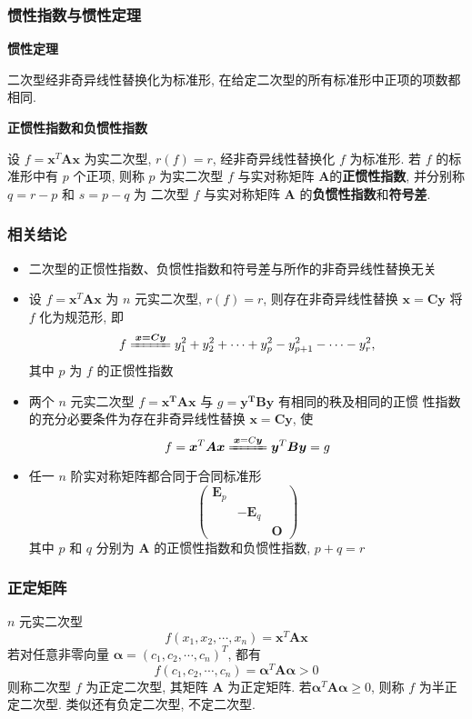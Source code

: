\documentclass{article}
\begin{document}
			\subsubsection{惯性指数与惯性定理}
				\textbf{惯性定理}

				二次型经非奇异线性替换化为标准形, 在给定二次型的所有标准形中正项的项数都相同.

				\textbf{正惯性指数和负惯性指数}

				设 $f=\boldsymbol{x}^{T} \boldsymbol{A} \boldsymbol{x}$ 为实二次型, $r(f)=r$, 经非奇异线性替换化 $f$ 为标准形. 若 $f$ 的标准形中有 $p$ 个正项, 则称 $p$ 为实二次型 $f$ 与实对称矩阵 $\boldsymbol{A}$的\textbf{正惯性指数}, 并分别称 $q=r-p$ 和 $s=p-q$ 为 二次型 $f$ 与实对称矩阵 $\boldsymbol{A}$ 的\textbf{负惯性指数}和\textbf{符号差}.
				\subsubsection*{相关结论}
				\begin{itemize}
					\item 二次型的正惯性指数、负惯性指数和符号差与所作的非奇异线性替换无关
					\item 设 $f=\boldsymbol{x}^{T} \boldsymbol{A} \boldsymbol{x}$ 为 $n$ 元实二次型, $r(f)=r$, 则存在非奇异线性替换 $\boldsymbol{x=Cy}$ 将 $f$ 化为规范形, 即
					$$
					f \xlongequal{\boldsymbol{x=Cy}}y_{1}^{2}+y_{2}^{2}+\cdots+y_{p}^{2}-y_{p+1}^{2}-\cdots-y_{r}^{2},
					$$
					其中 $p$ 为 $f$ 的正惯性指数
					\item 两个 $n$ 元实二次型 $f=\boldsymbol{x^{T} A x}$ 与 $g=\boldsymbol{y^{T} B y}$ 有相同的秩及相同的正惯 性指数的充分必要条件为存在非奇异线性替换 $\boldsymbol{x=Cy}$, 使
					$$
					f=\boldsymbol{x}^{T} \boldsymbol{A} \boldsymbol{x} \xlongequal{\boldsymbol{x}=C \boldsymbol{y}}\boldsymbol{y}^{T} \boldsymbol{B} 	\boldsymbol{y}=g
					$$
					\item 任一 $n$ 阶实对称矩阵都合同于合同标准形
					$$
					\left(\begin{array}{lll}
						\boldsymbol{E}_{p} & & \\
						& -\boldsymbol{E}_{q} & \\
						& & \boldsymbol{O}
					\end{array}\right)
					$$
					其中 $p$ 和 $q$ 分别为 $\boldsymbol{A}$ 的正惯性指数和负惯性指数, $p+q=r$
				\end{itemize}
			\subsubsection{正定矩阵}
				$n$ 元实二次型
				$$
				f\left(x_{1}, x_{2}, \cdots, x_{n}\right)=\boldsymbol{x}^{T} \boldsymbol{A} \boldsymbol{x}
				$$
				若对任意非零向量 $\boldsymbol{\alpha}=\left(c_{1}, c_{2}, \cdots, c_{n}\right)^{T}$, 都有
				$$
				f\left(c_{1}, c_{2}, \cdots, c_{n}\right)=\boldsymbol{\alpha}^{T} \boldsymbol{A} \boldsymbol{\alpha}>0
				$$
				则称二次型 $f$ 为正定二次型, 其矩阵 $\boldsymbol{A}$ 为正定矩阵. 若$\boldsymbol{\alpha}^{T} \boldsymbol{A} \boldsymbol{\alpha}\geqslant0$, 则称 $f$ 为半正定二次型. 类似还有负定二次型, 不定二次型.
\end{document}
